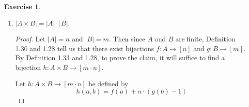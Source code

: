 \documentclass[titlepage]{article}
\newcounter{script}
\newtheorem*{lemma*}{Lemma}
\theoremstyle{definition}
\newtheorem{exercise}{Exercise}[script]
\begin{document}
\begin{exercise}
\begin{enumerate}[label={\alph*)}]
\begin{proof}
\begin{lemma*}
\begin{center}
                \end{center}
                \begin{proof}
                    All of these claims can be read directly from the above diagram --- for the sake of space and because proving these claims is not the main point of this exercise, a rigorous proof of this lemma will be omitted.
                \end{proof}
            \end{lemma*}
            Back to the main claim, we want to show that $|A\cup B|+|A\cap B|=|A|+|B|$, which we can do by using the above lemma to justify various manipulations inspired by part (b). To begin, use Lemma (a) as follows.
            \begin{align*}
                |A\cup B|+|A\cap B| &= |(B\setminus A)\cup A|+|A\cap B|
                \intertext{Since $(B\setminus A)\cup A$ is a union of two disjoint sets (see Lemma (b)), it follows by part (b) that the above}
                &= |B\setminus A|+|A|+|A\cap B|\\
                &= |A|+|B\setminus A|+|A\cap B|
                \intertext{Since $B\setminus A$ and $A\cap B$ are disjoint (see Lemma (d)), we know that the above}
                &= |A|+|(B\setminus A)\cup(A\cap B)|
                \intertext{Lastly, apply Lemma (c):}
                &= |A|+|B|
            \end{align*}
        \end{proof}
        \item $|A\times B|=|A|\cdot|B|$.
        \begin{proof}
            Let $|A|=n$ and $|B|=m$. Then since $A$ and $B$ are finite, Definition 1.30 and 1.28 tell us that there exist bijections $f:A\to[n]$ and $g:B\to[m]$. By Definition 1.33 and 1.28, to prove the claim, it will suffice to find a bijection $h:A\times B\to[m\cdot n]$.\par
            Let $h:A\times B\to[m\cdot n]$ be defined by
            \begin{equation*}
                h(a,b) = f(a)+n\cdot(g(b)-1)

\end{equation*}
\end{proof}
\end{enumerate}
\end{exercise}
\end{document}
